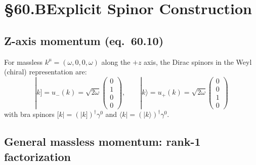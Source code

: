 \section{§60.B\quad Explicit Spinor Construction}

\subsection{Z-axis momentum (eq.~60.10)}

For massless $k^\mu=(\omega,0,0,\omega)$ along the $+z$ axis, the
Dirac spinors in the Weyl (chiral) representation are:
\begin{equation}
  \boxed{
    |k] = u_-(k) = \sqrt{2\omega}\begin{pmatrix}0\\1\\0\\0\end{pmatrix},
    \qquad
    |k\rangle = u_+(k) = \sqrt{2\omega}\begin{pmatrix}0\\0\\1\\0\end{pmatrix}
  }
  \tag{60.10}
\end{equation}
with bra spinors $[k| = (|k])^\dagger\gamma^0$ and
$\langle k| = (|k\rangle)^\dagger\gamma^0$.

\verified{Massless Dirac eq.\ $\slashed{k}|k] = 0$: max error $0$ (exact).}

\subsection{General massless momentum: rank-1 factorization}

